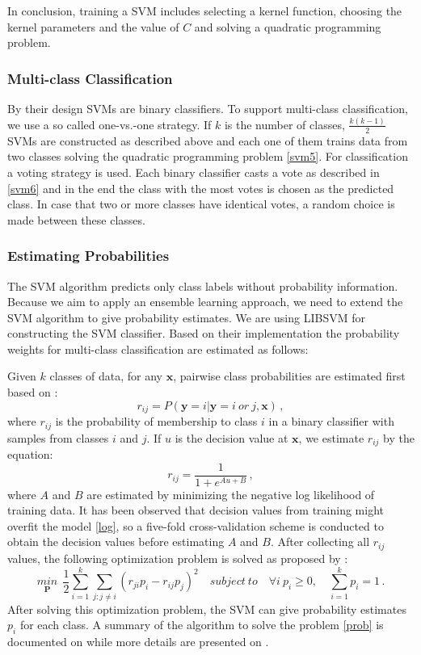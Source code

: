 \documentclass[a4paper,11pt,oneside]{article}
\begin{document}
In conclusion, training a SVM includes selecting a kernel function, choosing the kernel parameters and the value of $C$ and
solving a quadratic programming problem.
\subsubsection*{Multi-class Classification}
By their design SVMs are binary classifiers. To support multi-class classification, we use a so called one-vs.-one strategy.
If $k$ is the number of classes, $\frac{k(k-1)}{2}$ SVMs are constructed as described above and each one of them 
trains data from two classes solving the quadratic programming problem \ref{svm5}. For classification a voting strategy is used. Each binary classifier casts a vote
as described in \ref{svm6}
and in the end the class with the most votes is chosen as the predicted class. In case that two or more classes have identical votes, 
a random choice is made between these classes.
\subsubsection*{Estimating Probabilities}
The SVM algorithm predicts only class labels without probability information. Because we aim to apply an ensemble
learning approach, we need to extend the SVM algorithm to give probability estimates. We are using LIBSVM \cite{chang2011libsvm} for 
constructing the SVM classifier. Based on their implementation the probability weights for multi-class classification 
are estimated as follows:

Given $k$ classes of data, for any $\mathbf{x}$, pairwise class probabilities are estimated first based on \cite{lin2007note}:
\begin{equation*}
  r_{ij} = P(\mathbf{y}=i|\mathbf{y}=i\ or \ j,\mathbf{x})\,,
\end{equation*}where $r_{ij}$ is the probability of membership to class $i$ in a binary classifier
with samples from classes $i$ and $j$.
If $u$ is the decision value at $\mathbf{x}$, we estimate $r_{ij}$ by the equation:
\begin{equation}\label{log}
  r_{ij} = \frac{1}{1+e^{Au+B}}\,,
\end{equation}
where $A$ and $B$ are estimated by minimizing the negative log likelihood of training data. It has been observed that
decision values from training might overfit the model \ref{log}, so a five-fold cross-validation scheme is conducted to obtain
the decision values before estimating $A$ and $B$. After collecting all $r_{ij}$ values, the following optimization
problem is solved as proposed by \cite{wu2004probability}:
\begin{equation}\label{prob}
  \underset{\mathbf{P}}{min} \ \ \frac{1}{2}\sum_{i=1}^k \sum_{j:j\neq i}(r_{ji}p_i-r_{ij}p_j)^2
  \quad subject \ to \quad \forall i \ p_i\geq 0 ,\quad \sum_{i=1}^k p_i = 1\,.
\end{equation} 
After solving this optimization problem, the SVM can give probability estimates $p_i$ for each class.
A summary of the algorithm to solve the problem \ref{prob} is documented on \cite{chang2011libsvm} while 
more details are presented on \cite{wu2004probability}.
\end{document}
